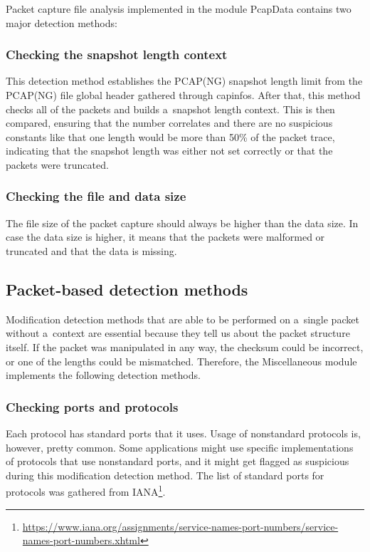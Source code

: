 \documentclass[
  printed,     %
  color,       %
  oneside,     %
  nosansbold,  %
  nocolorbold, %
  nolof,         %
  nolot,         %
]{fithesis4}
\begin{document}
Packet capture file analysis implemented in the module PcapData contains two major detection methods:

\subsubsection{Checking the snapshot length context}

This detection method establishes the PCAP(NG) snapshot length limit from the PCAP(NG) file global header gathered through capinfos. After that, this method checks all of the packets and builds a~snapshot length context. This is then compared, ensuring that the number correlates and there are no suspicious constants like that one length would be more than 50\% of the packet trace, indicating that the snapshot length was either not set correctly or that the packets were truncated.

\subsubsection{Checking the file and data size}

The file size of the packet capture should always be higher than the data size. In case the data size is higher, it means that the packets were malformed or truncated and that the data is missing.

\subsection{Packet-based detection methods}

Modification detection methods that are able to be performed on a~single packet without a~context are essential because they tell us about the packet structure itself. If the packet was manipulated in any way, the checksum could be incorrect, or one of the lengths could be mismatched. Therefore, the Miscellaneous module implements the following detection methods.

\subsubsection{Checking ports and protocols}

Each protocol has standard ports that it uses. Usage of nonstandard protocols is, however, pretty common. Some applications might use specific implementations of protocols that use nonstandard ports, and it might get flagged as suspicious during this modification detection method. The list of standard ports for protocols was gathered from IANA\footnote{\url{https://www.iana.org/assignments/service-names-port-numbers/service-names-port-numbers.xhtml}}.
\end{document}
